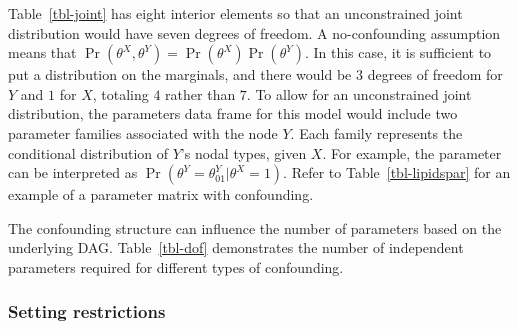 \documentclass[
  11pt,
  article]{jss}
\renewcommand{\texttt}[1]{\code{#1}}
\begin{document}
Table~\ref{tbl-joint} has eight interior elements so that an
unconstrained joint distribution would have seven degrees of freedom. A
no-confounding assumption means that
\(\Pr(\theta^X, \theta^Y) = \Pr(\theta^X)\Pr(\theta^Y)\). In this case,
it is sufficient to put a distribution on the marginals, and there would
be \(3\) degrees of freedom for \(Y\) and \(1\) for \(X\), totaling
\(4\) rather than \(7\). To allow for an unconstrained joint
distribution, the parameters data frame for this model would include two
parameter families associated with the node \(Y\). Each family
represents the conditional distribution of \(Y\)'s nodal types, given
\(X\). For example, the parameter \texttt{Y01\_X.1} can be interpreted
as \(\Pr(\theta^Y = \theta^Y_{01} | \theta^X=1)\). Refer to
Table~\ref{tbl-lipidspar} for an example of a parameter matrix with
confounding.

The confounding structure can influence the number of parameters based
on the underlying DAG. Table~\ref{tbl-dof} demonstrates the number of
independent parameters required for different types of confounding.

\begin{table}


\caption{\label{tbl-dof}Number of different independent parameters
(degrees of freedom) for different three-node models.}

\end{table}%

\subsubsection{Setting restrictions}\label{restrictions}
\end{document}
